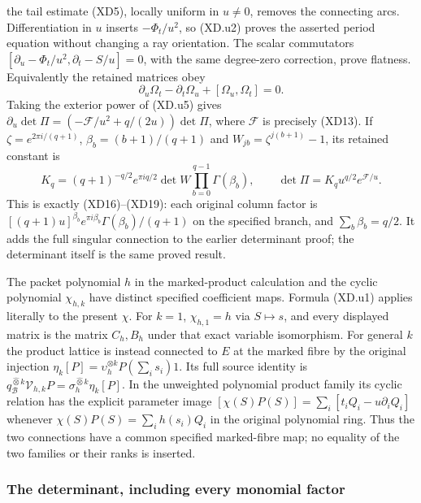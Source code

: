 the tail estimate (XD5), locally uniform in $u\ne0$, removes the
connecting arcs.  Differentiation in $u$ inserts $-\Phi_t/u^2$,
so (XD.u2) proves the asserted period equation without changing a ray
orientation.  The scalar commutators
$[\partial_u-\Phi_t/u^2,\partial_t-S/u]=0$, with the same
degree-zero correction, prove flatness.  Equivalently the retained
matrices obey
\[
 \partial_u\Omega_t-\partial_t\Omega_u+
                    [\Omega_u,\Omega_t]=0.           \tag{XD.u6}
\]
Taking the exterior power of (XD.u5) gives
$\partial_u\det\Pi=(-\mathcal F/u^2+q/(2u))\det\Pi$,
where $\mathcal F$ is precisely (XD13).  If
$\zeta=e^{2\pi i/(q+1)}$, $\beta_b=(b+1)/(q+1)$ and
$W_{jb}=\zeta^{j(b+1)}-1$, its retained constant is
\[
 K_q=(q+1)^{-q/2}e^{\pi i q/2}
          \det W\prod_{b=0}^{q-1}\Gamma(\beta_b),\qquad
 \det\Pi=K_q u^{q/2}e^{\mathcal F/u}.                \tag{XD.u7}
\]
This is exactly (XD16)--(XD19): each original column factor is
$[(q+1)u]^{\beta_b}e^{\pi i\beta_b}\Gamma(\beta_b)/(q+1)$
on the specified branch, and $\sum_b\beta_b=q/2$.
It adds the full singular connection to the earlier determinant proof;
the determinant itself is the same proved result.

The packet polynomial $h$ in the marked-product calculation and the
cyclic polynomial $\chi_{h,k}$ have distinct specified coefficient
maps.  Formula (XD.u1) applies literally to the present $\chi$.
For $k=1$, $\chi_{h,1}=h$ via $S\mapsto s$, and every displayed
matrix is the matrix $C_h,B_h$ under that exact variable isomorphism.
For general $k$ the product lattice is instead connected to $E$
at the marked fibre by the original injection
$\eta_k[P]=\upsilon_h^{\otimes k}P(\sum_i s_i)1$.
Its full source identity is
$q_{\mathscr B}^{\widehat\otimes k}\mathcal V_{h,k}P
=\sigma_h^{\widehat\otimes k}\eta_k[P]$.
In the unweighted polynomial product family its cyclic relation has
the explicit parameter image
$[\chi(S)P(S)]=\sum_i[t_iQ_i-u\partial_iQ_i]$ whenever
$\chi(S)P(S)=\sum_i h(s_i)Q_i$ in the original polynomial ring.
Thus the two connections have a common specified marked-fibre map;
no equality of the two families or their ranks is inserted.

\subsubsection{The determinant, including every monomial factor}

